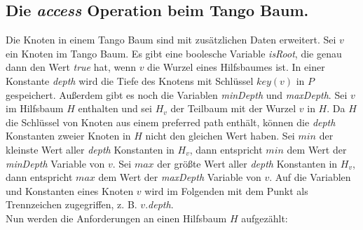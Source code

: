 \documentclass[a4paper,12pt]{article}
\begin{document}
\subsection{Die \textit{access} Operation beim Tango Baum.}
Die Knoten in einem Tango Baum sind mit zusätzlichen Daten erweitert. Sei $v$ ein Knoten im Tango Baum. Es gibt eine boolesche Variable \textit{isRoot}, die genau dann den Wert \textit{true} hat, wenn $v$ die Wurzel eines Hilfsbaumes ist. In einer Konstante \textit{depth} wird die Tiefe des Knotens mit Schlüssel $\mathit{key}\left(v\right)$ in $P$ gespeichert. Außerdem gibt es noch die Variablen \textit{minDepth} und \textit{maxDepth}. Sei $v$ im Hilfsbaum $H$ enthalten und sei $H_v$ der Teilbaum mit der Wurzel $v$ in $H$. Da $H$ die Schlüssel von Knoten aus einem preferred path enthält, können die \textit{depth} Konstanten zweier Knoten in $H$ nicht den gleichen Wert haben. Sei $\mathit{min}$ der kleinste Wert aller \textit{depth} Konstanten in $H_v$, dann entspricht $\mathit{min}$ dem  Wert der \textit{minDepth} Variable von $v$. Sei $\mathit{max}$ der größte Wert aller \textit{depth} Konstanten in $H_v$, dann entspricht $\mathit{max}$ dem  Wert der \textit{maxDepth} Variable von $v$. Auf die Variablen und Konstanten eines Knoten $v$ wird im Folgenden mit dem Punkt als Trennzeichen zugegriffen, z. B. $v$.\textit{depth}. \\
Nun werden die Anforderungen an einen Hilfsbaum $H$ aufgezählt:
\end{document}
